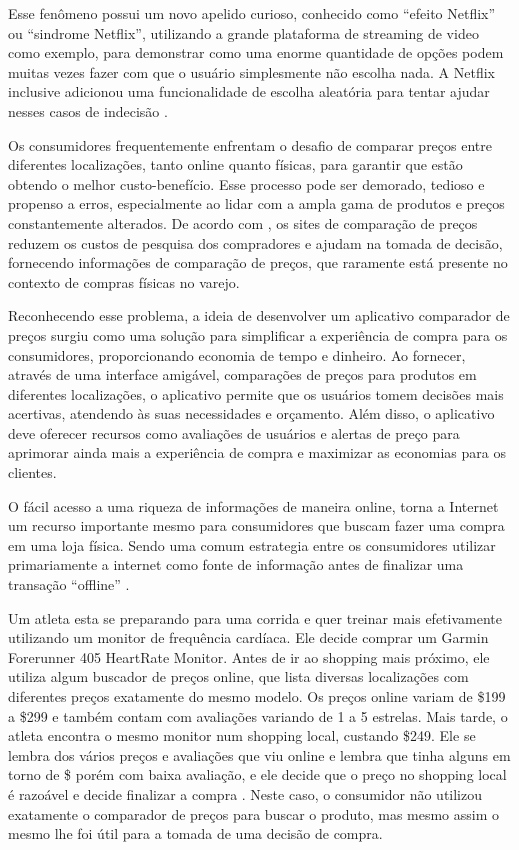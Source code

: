 Esse fenômeno possui um novo apelido curioso, conhecido como ``efeito Netflix'' ou ``sindrome Netflix'', utilizando a grande plataforma de streaming de video como exemplo, para demonstrar como uma enorme quantidade de opções podem muitas vezes fazer com que o usuário simplesmente não escolha nada. A Netflix inclusive adicionou uma funcionalidade de escolha aleatória para tentar ajudar nesses casos de indecisão \cite{estadao_paradoxo_escolha}.

Os consumidores frequentemente enfrentam o desafio de comparar preços entre diferentes localizações, tanto online quanto físicas, para garantir que estão obtendo o melhor custo-benefício. Esse processo pode ser demorado, tedioso e propenso a erros, especialmente ao lidar com a ampla gama de produtos e preços constantemente alterados. De acordo com \textcite{jung2014online}, os sites de comparação de preços reduzem os custos de pesquisa dos compradores e ajudam na tomada de decisão, fornecendo informações de comparação de preços,
que raramente está presente no contexto de compras físicas no varejo.


Reconhecendo esse problema, a ideia de desenvolver um aplicativo comparador de preços surgiu como uma solução para simplificar a experiência de compra para os consumidores, proporcionando economia de tempo e dinheiro. Ao fornecer, através de uma interface amigável, comparações de preços para produtos em diferentes localizações, o aplicativo permite que os usuários tomem decisões mais acertivas, atendendo às suas necessidades e orçamento. Além disso, o aplicativo deve oferecer recursos como avaliações de usuários e alertas de preço para aprimorar ainda mais a experiência de compra e maximizar as economias para os clientes.


O fácil acesso a uma riqueza de informações de maneira online, torna a Internet um recurso importante mesmo para consumidores que buscam fazer uma compra em uma loja física. Sendo uma comum estrategia entre os consumidores utilizar primariamente a internet como fonte de informação antes de finalizar uma transação ``offline'' \cite{pauwels2011does}. 

Um atleta esta se preparando para uma corrida e quer treinar mais efetivamente utilizando um monitor de frequência cardíaca. Ele decide comprar um Garmin Forerunner 405 HeartRate Monitor. Antes de ir ao shopping mais próximo, ele utiliza algum buscador de preços online, que lista diversas localizações com diferentes preços exatamente do mesmo modelo. Os preços online variam de \$199 a \$299 e também contam com avaliações variando de 1 a 5 estrelas. Mais tarde, o atleta encontra o mesmo monitor num shopping local, custando \$249. Ele se lembra dos vários preços e avaliações que viu online e lembra que tinha alguns em torno de \$ porém com baixa avaliação, e ele decide que o preço no shopping local é razoável e decide finalizar a compra \cite{bodur2015online}. Neste caso, o consumidor não utilizou exatamente o comparador de preços para buscar o produto, mas mesmo assim o mesmo lhe foi útil para a tomada de uma decisão de compra.

